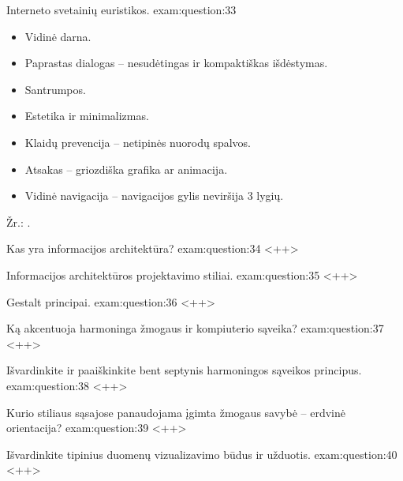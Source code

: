 \begin{question}{%
  Interneto svetainių euristikos.
  }{exam:question:33}
  \begin{itemize}
    \item Vidinė darna.
    \item Paprastas dialogas – nesudėtingas ir kompaktiškas išdėstymas.
    \item Santrumpos.
    \item Estetika ir minimalizmas.
    \item Klaidų prevencija – netipinės nuorodų spalvos.
    \item Atsakas – griozdiška grafika ar animacija.
    \item Vidinė navigacija – navigacijos gylis neviršija 3 lygių.
  \end{itemize}
  Žr.: \cite[50]{skaidres-12}.
\end{question}

\begin{question}{%
  Kas yra informacijos architektūra?
  }{exam:question:34}
  <++>
\end{question}

\begin{question}{%
  Informacijos architektūros projektavimo stiliai.
  }{exam:question:35}
  <++>
\end{question}

\begin{question}{%
  Gestalt principai.
  }{exam:question:36}
  <++>
\end{question}

\begin{question}{%
  Ką akcentuoja harmoninga žmogaus ir kompiuterio sąveika?
  }{exam:question:37}
  <++>
\end{question}

\begin{question}{%
  Išvardinkite ir paaiškinkite bent septynis harmoningos sąveikos
  principus.
  }{exam:question:38}
  <++>
\end{question}

\begin{question}{%
  Kurio stiliaus sąsajose panaudojama įgimta žmogaus savybė – erdvinė
  orientacija?
  }{exam:question:39}
  <++>
\end{question}

\begin{question}{%
  Išvardinkite tipinius duomenų vizualizavimo būdus ir užduotis.
  }{exam:question:40}
  <++>
\end{question}
